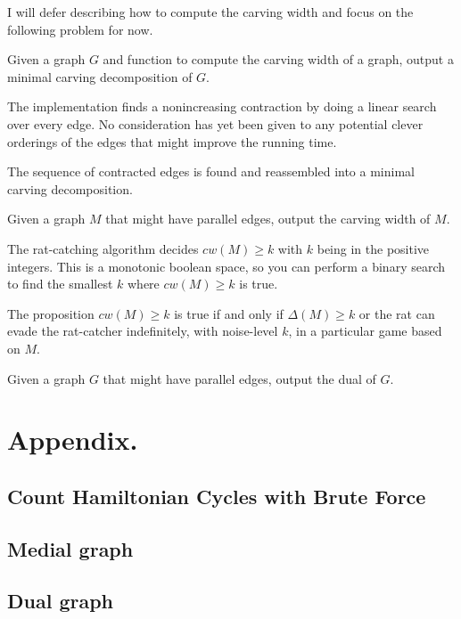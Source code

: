 \documentclass{article}
\begin{document}

	I will defer describing how to compute the carving width and focus on the following problem for now.

	\begin{problem}
		Given a graph $G$ and function to compute the carving width of a graph, output a minimal carving decomposition of $G$.
	\end{problem}

	The implementation finds a nonincreasing contraction by doing a linear search over every edge. No consideration has yet been given to any potential clever orderings of the edges that might improve the running time.

	The sequence of contracted edges is found and reassembled into a minimal carving decomposition.


	\begin{problem}
		Given a graph $M$ that might have parallel edges, output the carving width of $M$.
	\end{problem}

	The rat-catching algorithm decides $cw(M) \geq k$ with $k$ being in the positive integers. This is a monotonic boolean space, so you can perform a binary search to find the smallest $k$ where $cw(M) \geq k$ is true.

	The proposition $cw(M) \geq k$ is true if and only if $\Delta(M) \geq k$ or the rat can evade the rat-catcher indefinitely, with noise-level $k$, in a particular game based on $M$.


	\begin{problem}
		Given a graph $G$ that might have parallel edges, output the dual of $G$.
	\end{problem}
\section{Appendix.}

	\subsection{Count Hamiltonian Cycles with Brute Force}
		\label{appx:count-hamcyc-brute-force}

	\subsection{Medial graph}
		\label{appx:medial-graph}

	\subsection{Dual graph}
		\label{appx:dual-graph}
\end{document}
